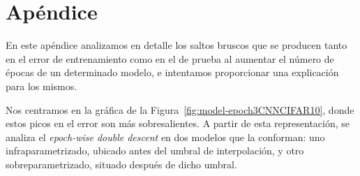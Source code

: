 
\chapter{Apéndice}\label{ap:apendiceD}

En este apéndice analizamos en detalle los saltos bruscos que se producen tanto en el error de entrenamiento como en el de prueba al aumentar el número de épocas de un determinado modelo, e intentamos proporcionar una explicación para los mismos.\newline

Nos centramos en la gráfica de la Figura~\ref{fig:model-epoch3CNNCIFAR10}, donde estos picos en el error son más sobresalientes. A partir de esta representación, se analiza el \textit{epoch-wise double descent} en dos modelos que la conforman: uno infraparametrizado, ubicado antes del umbral de interpolación, y otro sobreparametrizado, situado después de dicho umbral.\newline

